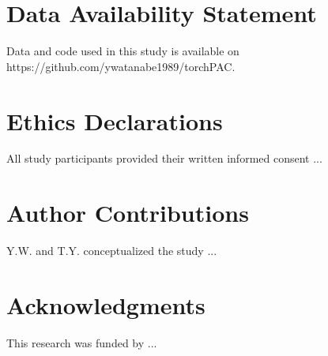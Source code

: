 \documentclass[preprint,review,12pt]{elsarticle}%
\begin{document}
\begin{frontmatter}
\section*{Data Availability Statement}
Data and code used in this study is available on https://github.com/ywatanabe1989/torchPAC.
\label{data and code availability}







% 

% 




\section*{Ethics Declarations}
All study participants provided their written informed consent ...
\label{ethics declarations}

\section*{Author Contributions}
Y.W. and T.Y. conceptualized the study ...
\label{author contributions}

\section*{Acknowledgments}
This research was funded by ...
\label{acknowledgments}


\end{frontmatter}
\end{document}
